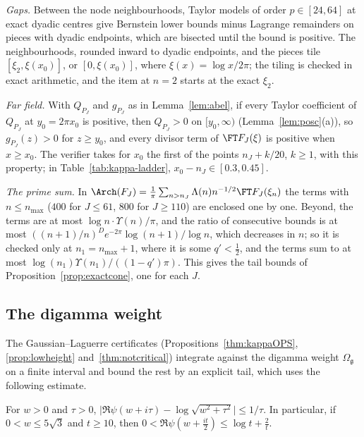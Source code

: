 \emph{Gaps.} Between the node neighbourhoods, Taylor models of order $p\in[24,64]$ at exact dyadic centres give Bernstein lower bounds minus
Lagrange remainders on pieces with dyadic endpoints, which are bisected until the bound is positive. The neighbourhoods, rounded inward to
dyadic endpoints, and the pieces tile $[\xi_2,\xi(x_0)]$, or $[0,\xi(x_0)]$, where $\xi(x)=\log x/2\pi$; the tiling is checked in exact
arithmetic, and the item at $n=2$ starts at the exact $\xi_2$.

\emph{Far field.} With $Q_{P_J}$ and $g_{P_J}$ as in Lemma~\ref{lem:abel}, if every Taylor coefficient of $Q_{P_J}$ at $y_0=2\pi x_0$ is
positive, then $Q_{P_J}>0$ on $[y_0,\infty)$ (Lemma~\ref{lem:posc}(a)), so $g_{P_J}(z)>0$ for $z\ge y_0$, and every divisor term of
$\FT F_J(\xi)$ is positive when $x\ge x_0$. The verifier takes for $x_0$ the first of the points $n_J+k/20$, $k\ge1$, with this property; in
Table~\ref{tab:kappa-ladder}, $x_0-n_J\in[0.3,0.45]$.

\emph{The prime sum.} In $\Arch(F_J)=\frac1\pi\sum_{n>n_J}\Lambda(n)n^{-1/2}\FT F_J(\xi_n)$ the terms with $n\le n_{\max}$ ($400$ for
$J\le61$, $800$ for $J\ge110$) are enclosed one by one. Beyond, the terms are at most $\log n\cdot\Upsilon(n)/\pi$, and the ratio of
consecutive bounds is at most $((n+1)/n)^De^{-2\pi}\log(n+1)/\log n$, which decreases in $n$; so it is checked only at $n_1=n_{\max}+1$,
where it is some $q'<\frac12$, and the terms sum to at most $\log(n_1)\Upsilon(n_1)/((1-q')\pi)$. This gives the tail bounds of Proposition~\ref{prop:exactcone}, one for each $J$.

\subsection{The digamma weight}

The Gaussian--Laguerre certificates (Propositions~\ref{thm:kappaOPS}, \ref{prop:lowheight} and~\ref{thm:notcritical}) integrate against the
digamma weight $\Omega_{\mathfrak g}$ on a finite interval and bound the rest by an explicit tail, which uses the following estimate.

\begin{lemma}\label{lem:digamma}
For $w>0$ and $\tau>0$, $\bigl|\Re\psi(w+i\tau)-\log\sqrt{w^2+\tau^2}\bigr|\le1/\tau$. In particular, if $0<w\le5\sqrt3$ and $t\ge10$, then
$0<\Re\psi(w+\frac{it}2)\le\log t+\frac2t$.
\end{lemma}

